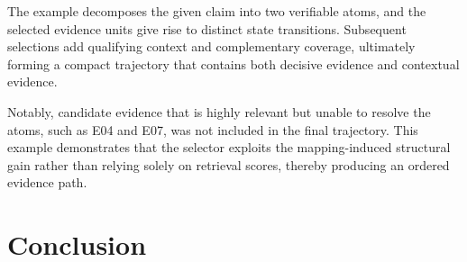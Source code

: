 \documentclass[letterpaper]{article}
\begin{document}
The example decomposes the given claim into two verifiable atoms, and the selected evidence units give rise to distinct state transitions. Subsequent selections add qualifying context and complementary coverage, ultimately forming a compact trajectory that contains both decisive evidence and contextual evidence.

Notably, candidate evidence that is highly relevant but unable to resolve the atoms, such as E04 and E07, was not included in the final trajectory. This example demonstrates that the selector exploits the mapping-induced structural gain rather than relying solely on retrieval scores, thereby producing an ordered evidence path.



\section{Conclusion}


\end{document}
